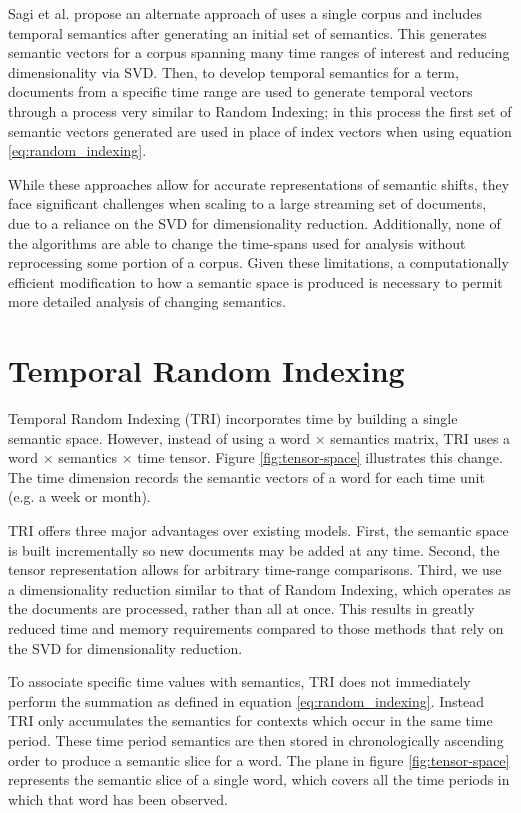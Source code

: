 \documentclass[a4paper,twocolumn,twoside,10pt]{ranlp}
\begin{document}
Sagi et al. propose an alternate approach of uses a single corpus and includes
temporal semantics after generating an initial set of
semantics\cite{SagiSemanticDensity}.  This generates semantic vectors for a
corpus spanning many time ranges of interest and reducing dimensionality via
SVD.  Then, to develop temporal semantics for a term, documents from a specific
time range are used to generate temporal vectors through a process very similar
to Random Indexing; in this process the first set of semantic vectors generated
are used in place of index vectors when using equation
\eqref{eq:random_indexing}.

While these approaches allow for accurate representations of semantic shifts,
they face significant challenges when scaling to a large streaming set of
documents, due to a reliance on the SVD for dimensionality reduction.
Additionally, none of the algorithms are able to change the time-spans used for
analysis without reprocessing some portion of a corpus.  Given these
limitations, a computationally efficient modification to how a semantic space is
produced is necessary to permit more detailed analysis of changing semantics.

\section{Temporal Random Indexing}

Temporal Random Indexing (TRI) incorporates time by building a single semantic
space.  However, instead of using a word $\times$ semantics matrix, TRI uses a
word $\times$ semantics $\times$ time tensor.  Figure \ref{fig:tensor-space}
illustrates this change.  The time dimension records the semantic vectors of a
word for each time unit (e.g. a week or month).  

TRI offers three major advantages over existing models.  First, the semantic
space is built incrementally so new documents may be added at any time.  Second,
the tensor representation allows for arbitrary time-range comparisons.  Third,
we use a dimensionality reduction similar to that of Random Indexing, which
operates as the documents are processed, rather than all at once.  This results
in greatly reduced time and memory requirements compared to those methods that
rely on the SVD for dimensionality reduction.

To associate specific time values with semantics, TRI does not
immediately perform the summation as defined in equation
\eqref{eq:random_indexing}.  Instead TRI only accumulates the semantics for
contexts which occur in the same time period.  These time period semantics are
then stored in chronologically ascending order to produce a semantic slice for a
word.  The plane in figure \ref{fig:tensor-space} represents the semantic slice
of a single word, which covers all the time periods in which that word has been
observed.
\end{document}
